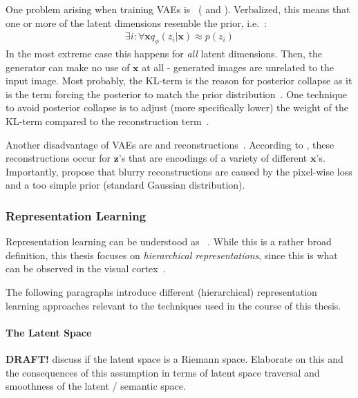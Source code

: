 One problem arising when training \acp{VAE} is ~(\citep{lucas2019understanding} and \citep[p. 694]{Goodfellow-et-al-2016}).
Verbalized, this means that one or more of the latent dimensions resemble the prior, i.e.~\citep{lucas2019understanding}:
\begin{align}
    \exists i: \forall \mathbf{x} q_{\phi}\left(z_{i} | \mathbf{x}\right) \approx p\left(z_{i}\right)
\end{align}
In the most extreme case this happens for \textit{all} latent dimensions.
Then, the generator can make no use of $\bm{x}$ at all - generated images are unrelated to the input image.
Most probably, the KL-term is the reason for posterior collapse as it is the term forcing the posterior to match the prior distribution~\citep{lucas2019understanding}.
One technique to avoid posterior collapse is to adjust (more specifically lower) the weight of the KL-term compared to the reconstruction term~\citep{lucas2019understanding}.

Another disadvantage of \acp{VAE} are  and  reconstructions~\citep{zhao2017towards}.
According to \citet{zhao2017towards}, these reconstructions occur for $\bm{z}$'s that are encodings of a variety of different $\bm{x}$'s.
Importantly, \citet{zhao2017towards} propose that blurry reconstructions are caused by the pixel-wise loss and a too simple prior (standard Gaussian distribution).

\subsubsection{Representation Learning}\label{subsubsec:representation_learning}

Representation learning can be understood as ~\citep{bengio2013representation}.
While this is a rather broad definition, this thesis focuses on \textit{hierarchical representations}, since this is what can be observed in the visual cortex~\citep{rodriguez2015hierarchical}.

The following paragraphs introduce different (hierarchical) representation learning approaches relevant to the techniques used in the course of this thesis.

\paragraph{The Latent Space}
\textbf{DRAFT!}
\citet{shao2018riemannian,arvanitidis2017latent} discuss if the latent space is a Riemann space.
Elaborate on this and the consequences of this assumption in terms of latent space traversal and smoothness of the latent / semantic space.

